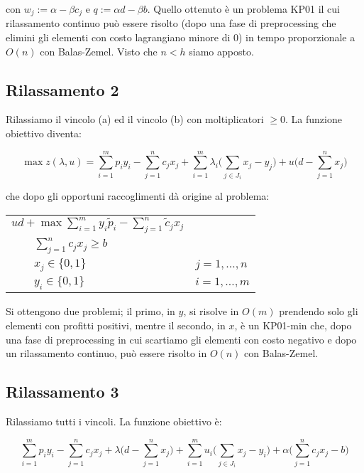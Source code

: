 \documentclass[11pt]{book}
\begin{document}
con $w_j := \alpha - \beta c_j$ e $q := \alpha d - \beta b$. Quello
ottenuto \`e un problema KP01 il cui rilassamento continuo pu\`o
essere risolto (dopo una fase di preprocessing che elimini gli
elementi con costo lagrangiano minore di 0) in tempo proporzionale a
$O(n)$ con Balas-Zemel. Visto che $n < h$ siamo apposto.

\subsection*{Rilassamento 2}

Rilassiamo il vincolo (a) ed il vincolo (b) con moltiplicatori $\geq
0$. La funzione obiettivo diventa:

$$
\max z(\lambda, u) = \sum\limits_{i=1}^m p_i y_i - \sum\limits_{j=1}^n
c_jx_j + \sum\limits_{i=1}^m \lambda_i \Bigr ( \sum\limits_{j \in J_i} x_j -
y_j \Bigr ) + u \Bigr ( d - \sum\limits_{j=1}^n x_j \Bigr )
$$

che dopo gli opportuni raccoglimenti d\`a origine al problema:

\begin{center}
\begin{tabular}{ll}
  $ud + \max \sum\limits_{i=1}^m y_i \tilde{p}_i - \sum\limits_{j=1}^n
  \tilde{c}_jx_j$ \\
$\qquad \sum\limits_{j=1}^n c_j x_j \geq b$ \\
$\qquad x_j \in \{0,1\}$ & $j=1,\dots,n$ \\
$\qquad y_i \in \{0,1\}$ & $i=1,\dots,m$ \\
\end{tabular}
\end{center}

Si ottengono due problemi; il primo, in $y$, si risolve in $O(m)$
prendendo solo gli elementi con profitti positivi, mentre il secondo,
in $x$, \`e un KP01-min che, dopo una fase di preprocessing in cui
scartiamo gli elementi con costo negativo e dopo un rilassamento
continuo, pu\`o essere risolto in $O(n)$ con Balas-Zemel.

\subsection*{Rilassamento 3}

Rilassiamo tutti i vincoli. La funzione obiettivo \`e:

$$
\sum\limits_{i=1}^m p_i y_i - \sum\limits_{j=1}^n c_j x_j + \lambda
\Bigr ( d
- \sum\limits_{j=1}^n x_j \Bigr ) + \sum\limits_{i=1}^m u_i
\Bigr ( \sum\limits_{j \in J_i} x_j - y_i \Bigr ) + \alpha \Bigr ( \sum\limits_{j=1}^n
c_jx_j -b \Bigr )
$$
\end{document}

